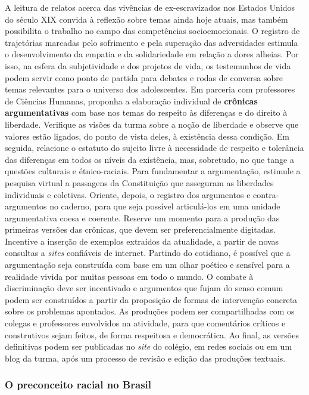 \documentclass[11pt]{extarticle}
\begin{document}
A leitura de relatos acerca das vivências de ex-escravizados nos
Estados Unidos do século XIX convida à reflexão sobre temas ainda hoje
atuais, mas também possibilita o trabalho no campo das competências
socioemocionais. O registro de trajetórias marcadas pelo sofrimento e
pela superação das adversidades estimula o desenvolvimento da empatia
e da solidariedade em relação a dores alheias. Por isso, na esfera da
subjetividade e dos projetos de vida, os testemunhos de vida podem
servir como ponto de partida para debates e rodas de conversa sobre
temas relevantes para o universo dos adolescentes. Em parceria com
professores de Ciências Humanas, proponha a elaboração individual de
\textbf{crônicas argumentativas} com base nos temas do respeito às
diferenças e do direito à liberdade. Verifique as visões da turma
sobre a noção de liberdade e observe que valores estão ligados, do
ponto de vista deles, à existência dessa condição. Em seguida,
relacione o estatuto do sujeito livre à necessidade de respeito e
tolerância das diferenças em todos os níveis da existência, mas,
sobretudo, no que tange a questões culturais e étnico-raciais. Para
fundamentar a argumentação, estimule a pesquisa virtual a passagens da
Constituição que asseguram as liberdades individuais e coletivas.
Oriente, depois, o registro dos argumentos e contra-argumentos no
caderno, para que seja possível articulá-los em uma unidade
argumentativa coesa e coerente. Reserve um momento para a produção das
primeiras versões das crônicas, que devem ser preferencialmente
digitadas. Incentive a inserção de exemplos extraídos da atualidade, a
partir de novas consultas a \emph{sites} confiáveis de internet.
Partindo do cotidiano, é possível que a argumentação seja construída
com base em um olhar poético e sensível para a realidade vivida por
muitas pessoas em todo o mundo. O combate à discriminação deve ser
incentivado e argumentos que fujam do senso comum podem ser
construídos a partir da proposição de formas de intervenção concreta
sobre os problemas apontados. As produções podem ser compartilhadas
com os colegas e professores envolvidos na atividade, para que
comentários críticos e construtivos sejam feitos, de forma respeitosa
e democrática. Ao final, as versões definitivas podem ser publicadas
no \emph{site} do colégio, em redes sociais ou em um blog da turma,
após um processo de revisão e edição das produções textuais.

\subsubsection{O preconceito racial no Brasil}
\end{document}
